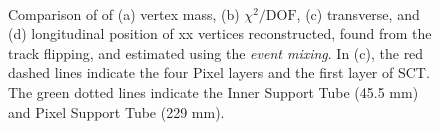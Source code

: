 \begin{figure}[!htb]
    \centering
     \\
    \caption{Comparison of of (a) vertex mass, (b) $\chi^{2} / \mathrm{DOF}$, (c) transverse, and (d) longitudinal position of xx vertices reconstructed, found from the track flipping, and estimated using the \textit{event mixing}. In (c), the red dashed lines indicate the four Pixel layers and the first layer of SCT. The green dotted lines indicate the Inner Support Tube (45.5 mm) and Pixel Support Tube (229 mm).}
    \label{fig:random-crossing_vertex_dist}
\end{figure}

